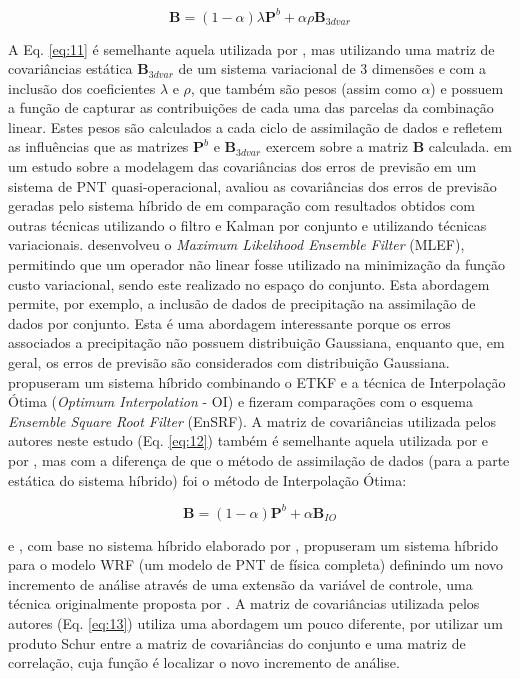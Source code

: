 \begin{equation}
\label{eq:11}
\mathbf{B}=(1-\alpha)\lambda\mathbf{P}^{b}+\alpha\rho\mathbf{B}_{3dvar}
\end{equation}

A Eq. \ref{eq:11} é semelhante aquela utilizada por , mas utilizando uma matriz de covariâncias estática $\mathbf{B}_{3dvar}$ de um sistema variacional de 3 dimensões e com a inclusão dos coeficientes $\lambda$ e $\rho$, que também são pesos (assim como $\alpha$) e possuem a função de capturar as contribuições de cada uma das parcelas da combinação linear. Estes pesos são calculados a cada ciclo de assimilação de dados e refletem as influências que as matrizes $\mathbf{P}^{b}$ e $\mathbf{B}_{3dvar}$ exercem sobre a matriz $\mathbf{B}$ calculada.  em um estudo sobre a modelagem das covariâncias dos erros de previsão em um sistema de PNT quasi-operacional, avaliou as covariâncias dos erros de previsão geradas pelo sistema híbrido de  em comparação com resultados obtidos com outras técnicas utilizando o filtro e Kalman por conjunto e utilizando técnicas variacionais.  desenvolveu o \textit{Maximum Likelihood Ensemble Filter} (MLEF), permitindo que um operador não linear fosse utilizado na minimização da função custo variacional, sendo este realizado no espaço do conjunto. Esta abordagem permite, por exemplo, a inclusão de dados de precipitação na assimilação de dados por conjunto. Esta é uma abordagem interessante porque os erros associados a precipitação não possuem distribuição Gaussiana, enquanto que, em geral, os erros de previsão são considerados com distribuição Gaussiana.  propuseram um sistema híbrido combinando o ETKF e a técnica de Interpolação Ótima (\textit{Optimum Interpolation} - OI) e fizeram comparações com o esquema \textit{Ensemble Square Root Filter} (EnSRF). A matriz de covariâncias utilizada pelos autores neste estudo (Eq. \ref{eq:12}) também é semelhante aquela utilizada por  e por , mas com a diferença de que o método de assimilação de dados (para a parte estática do sistema híbrido) foi o método de Interpolação Ótima:

\begin{equation}
\label{eq:12}
\mathbf{B}=(1-\alpha)\mathbf{P}^{b}+\alpha\mathbf{B}_{IO}
\end{equation}

 e , com base no sistema híbrido elaborado por , propuseram um sistema híbrido para o modelo WRF (um modelo de PNT de física completa) definindo um novo incremento de análise através de uma extensão da variável de controle, uma técnica originalmente proposta por . A matriz de covariâncias utilizada pelos autores (Eq. \ref{eq:13}) utiliza uma abordagem um pouco diferente, por utilizar um produto Schur entre a matriz de covariâncias do conjunto e uma matriz de correlação, cuja função é localizar o novo incremento de análise.


